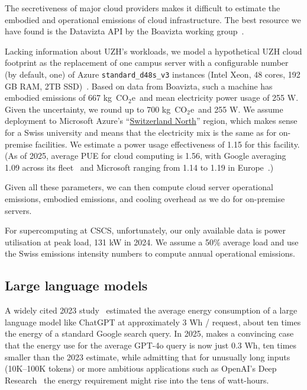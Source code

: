 \documentclass[11pt]{article}
\newcommand{\coe}{CO$_2$e}
\newcommand{\gcoe}{g~\coe}
\newcommand{\kgcoe}{k\gcoe}
\begin{document}
The secretiveness of major cloud providers makes it difficult to estimate the embodied and operational emissions of cloud infrastructure. The best resource we have found is the Datavizta API by the Boavizta working group~\cite{boavizta:api}.

Lacking information about UZH's workloads, we model a hypothetical UZH cloud footprint as the replacement of one campus server with a configurable number (by default, one) of Azure {\tt standard\_d48s\_v3} instances (Intel Xeon, 48 cores, 192 GB RAM, 2TB SSD)~\cite{msftvms}. Based on data from Boavizta, such a machine has embodied emissions of 667 \kgcoe\ and mean electricity power usage of 255 W. Given the uncertainty, we round up to 700 \kgcoe\ and 255 W. We assume deployment to Microsoft Azure's ``\href{https://datacenters.microsoft.com/globe/explore?info=region_switzerlandnorth}{Switzerland North}'' region, which makes sense for a Swiss university and means that the electricity mix is the same as for on-premise facilities. We estimate a power usage effectiveness of 1.15 for this facility. (As of 2025, average PUE for cloud computing is 1.56, with Google averaging 1.09 across its fleet~\cite{google:datacenter:efficiency} and Microsoft ranging from 1.14 to 1.19 in Europe~\cite{microsoft:datacenter:efficiency}.)

Given all these parameters, we can then compute cloud server operational emissions, embodied emissions, and cooling overhead as we do for on-premise servers.

For supercomputing at CSCS, unfortunately, our only available data is power utilisation at peak load, 131 kW in 2024. We assume a 50\% average load and use the Swiss emissions intensity numbers to compute annual operational emissions.

\subsection{Large language models}

A widely cited 2023 study~\cite{devries2023growing} estimated the average energy consumption of a large language model like ChatGPT at approximately 3 Wh / request, about ten times the energy of a standard Google search query. In 2025, \textcite{epoch2025howmuchenergydoeschatgptuse} makes a convincing case that the energy use for the average GPT-4o query is now just 0.3 Wh, ten times smaller than the 2023 estimate, while admitting that for unusually long inputs (10K--100K tokens) or more ambitious applications such as OpenAI's Deep Research~\cite{oai:deepresearch} the energy requirement might rise into the tens of watt-hours.
\end{document}
